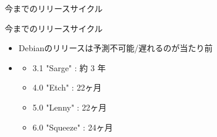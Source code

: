 {
\begin{frame}[plain]%
\end{frame}
}

\begin{frame}

\begin{center}
\end{center}

\end{frame}

\begin{frame}{今までのリリースサイクル}

\begin{center}
\end{center}

\end{frame}

\begin{frame}{今までのリリースサイクル}

\begin{itemize}
\item Debianのリリースは予測不可能/遅れるのが当たり前
\item \color{red}{Etch から ほぼ 2 年毎のリリース}
\begin{itemize}
  \item 3.1 "Sarge"   : 約 3 年
  \item 4.0 "Etch"    : 22ヶ月
  \item 5.0 "Lenny"   : 22ヶ月
  \item 6.0 "Squeeze" : 24ヶ月
\end{itemize}
\end{itemize}

\end{frame}

